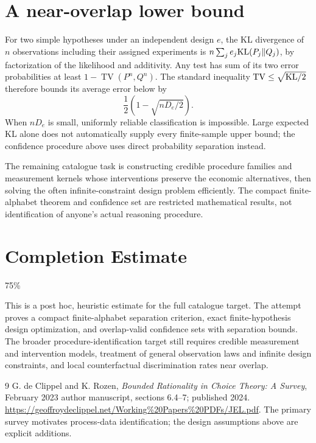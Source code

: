 \documentclass[11pt,a4paper]{article}
\begin{document}
\section{A near-overlap lower bound}
For two simple hypotheses under an independent design $e$, the KL divergence of $n$ observations including their assigned experiments is $n\sum_je_j{\rm KL}(P_j\Vert Q_j)$, by factorization of the likelihood and additivity. Any test has sum of its two error probabilities at least $1-\operatorname{TV}(P^n,Q^n)$. The standard inequality $\operatorname{TV}\le\sqrt{{\rm KL}/2}$ therefore bounds its average error below by
\[
 \frac12\left(1-\sqrt{nD_e/2}\right).
\]
When $nD_e$ is small, uniformly reliable classification is impossible. Large expected KL alone does not automatically supply every finite-sample upper bound; the confidence procedure above uses direct probability separation instead.

The remaining catalogue task is constructing credible procedure families and measurement kernels whose interventions preserve the economic alternatives, then solving the often infinite-constraint design problem efficiently. The compact finite-alphabet theorem and confidence set are restricted mathematical results, not identification of anyone's actual reasoning procedure.

\section{Completion Estimate}
75\%

This is a post hoc, heuristic estimate for the full catalogue target.
The attempt proves a compact finite-alphabet separation criterion, exact finite-hypothesis design optimization, and overlap-valid confidence sets with separation bounds. The broader procedure-identification target still requires credible measurement and intervention models, treatment of general observation laws and infinite design constraints, and local counterfactual discrimination rates near overlap.

\begin{thebibliography}{9}
 G. de Clippel and K. Rozen, \emph{Bounded Rationality in Choice Theory: A Survey}, February 2023 author manuscript, sections 6.4--7; published 2024.
\url{https://geoffroydeclippel.net/Working%20Papers%20PDFs/JEL.pdf}.
The primary survey motivates process-data identification; the design assumptions above are explicit additions.
\end{thebibliography}
\end{document}
